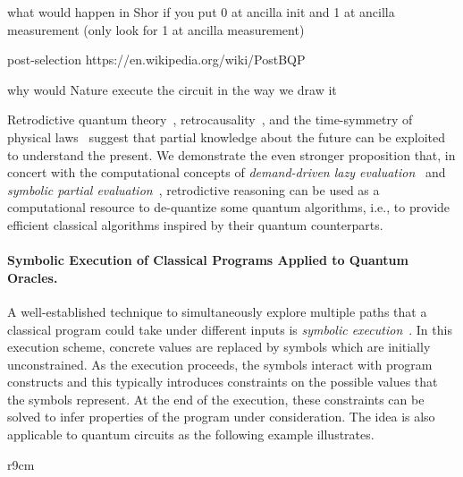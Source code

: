 \documentclass{article}
\begin{document}
\begin{refsection}
{  what would happen in Shor if you put 0 at ancilla init and 1 at
  ancilla measurement (only look for 1 at ancilla measurement)

  post-selection https://en.wikipedia.org/wiki/PostBQP

  why would Nature execute the circuit in the way we draw it

}

Retrodictive quantum theory~\cite{sym13040586},
retrocausality~\cite{Aharonov2008}, and the time-symmetry of physical
laws~\cite{RevModPhys.27.179} suggest that partial knowledge about the
future can be exploited to understand the present. We demonstrate the
even stronger proposition that, in concert with the computational
concepts of \emph{demand-driven lazy evaluation}~\cite{lazyevaluator}
and \emph{symbolic partial evaluation}~\cite{futamura}, retrodictive
reasoning can be used as a computational resource to de-quantize some
quantum algorithms, i.e., to provide efficient classical algorithms
inspired by their quantum counterparts.

\paragraph*{Symbolic Execution of Classical Programs Applied to Quantum Oracles.}
A well-established technique to simultaneously explore multiple paths
that a classical program could take under different inputs is
\emph{symbolic
  execution}~\cite{10.1145/390016.808445,10.1145/360248.360252,howden,10.1145/800191.805647,10.1145/3182657}. In
this execution scheme, concrete values are replaced by symbols which are
initially unconstrained. As the execution proceeds, the symbols
interact with program constructs and this typically introduces
constraints on the possible values that the symbols represent. At the
end of the execution, these constraints can be solved to infer
properties of the program under consideration. The idea is also
applicable to quantum circuits as the following example illustrates.

\begin{wrapfigure}{r}{9cm}
\end{wrapfigure}
\end{refsection}
\end{document}
